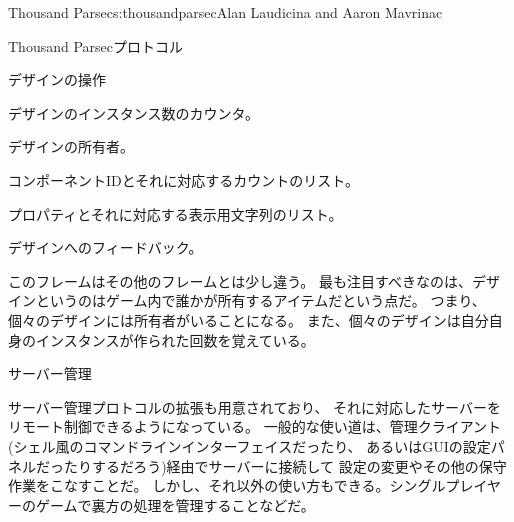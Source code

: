 \begin{aosachapter}{Thousand Parsec}{s:thousandparsec}{Alan Laudicina and Aaron Mavrinac}
\begin{aosasect1}{Thousand Parsecプロトコル}
\begin{aosasect2}{デザインの操作}
\begin{aosaitemize}
  \item デザインのインスタンス数のカウンタ。

  \item デザインの所有者。

  \item コンポーネントIDとそれに対応するカウントのリスト。

  \item プロパティとそれに対応する表示用文字列のリスト。

  \item デザインへのフィードバック。

\end{aosaitemize}

このフレームはその他のフレームとは少し違う。
最も注目すべきなのは、デザインというのはゲーム内で誰かが所有するアイテムだという点だ。
つまり、個々のデザインには所有者がいることになる。
また、個々のデザインは自分自身のインスタンスが作られた回数を覚えている。

\end{aosasect2}

\begin{aosasect2}{サーバー管理}

サーバー管理プロトコルの拡張も用意されており、
それに対応したサーバーをリモート制御できるようになっている。
一般的な使い道は、管理クライアント(シェル風のコマンドラインインターフェイスだったり、
あるいはGUIの設定パネルだったりするだろう)経由でサーバーに接続して
設定の変更やその他の保守作業をこなすことだ。
しかし、それ以外の使い方もできる。シングルプレイヤーのゲームで裏方の処理を管理することなどだ。


\end{aosasect2}
\end{aosasect1}
\end{aosachapter}
